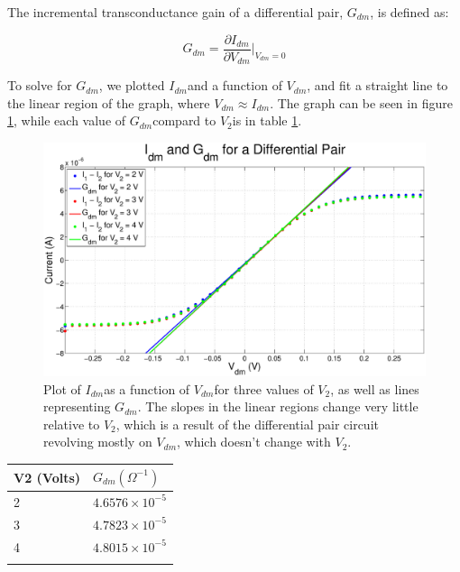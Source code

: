 \documentclass{article}
\newcommand{\Vtwo}{{$V_{2}$}}
\newcommand{\gdm}{{$G_{dm}$}}
\newcommand{\Vdm}{{$V_{dm}$}}
\newcommand{\Idm}{{$I_{dm}$}}
\begin{document}
The incremental transconductance gain of a differential pair, \gdm, is defined as:

\begin{equation}
G_{dm} = \frac{\partial I_{dm}}{\partial V_{dm}}\bigg|_{V_{dm} = 0}
\label{eq:gdm}
\end{equation}

To solve for \gdm, we plotted \Idm and a function of \Vdm, and fit a straight line to the linear region of the graph, where $V_{dm} \approx I_{dm}$. The graph can be seen in figure \ref{fig:gdm}, while each value of \gdm compard to \Vtwo is in table \ref{tb:gdm}.

\begin{figure}[H]
\centering
\includegraphics[width=\linewidth]{./Figures/Gdm.eps}
\caption{Plot of \Idm as a function of \Vdm for three values of \Vtwo, as well as lines representing \gdm. The slopes in the linear regions change very little relative to \Vtwo, which is a result of the differential pair circuit revolving mostly on \Vdm, which doesn't change with \Vtwo.}
\label{fig:gdm}
\end{figure}

\begin{table}[h]
\begin{center}
    \begin{tabular}{ l | l  }
        V2 (Volts) & $G_{dm} (\Omega^{-1})$ \\
        \hline
        2 & $ 4.6576 \times 10^{-5}$ \\
        3 & $ 4.7823 \times 10^{-5}$ \\
        4 & $ 4.8015 \times 10^{-5}$ \\
        \label{tb:gdm}
    \end{tabular}
\end{center}
\end{table}
\end{document}
